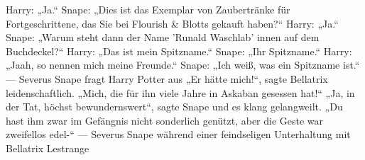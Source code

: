 \documentclass[a4paper, 10pt]{article}
\begin{document}
\newline
{}  
Harry: „Ja.“
\vspace{10pt}
\newline
{}  
Snape: „Dies ist das Exemplar von Zaubertränke für Fortgeschrittene, das Sie bei Flourish & Blotts gekauft haben?“
\vspace{10pt}
\newline
{}  
Harry: „Ja.“
\vspace{10pt}
\newline
{}  
Snape: „Warum steht dann der Name 'Runald Waschlab' innen auf dem Buchdeckel?“
\vspace{10pt}
\newline
{}  
Harry: „Das ist mein Spitzname.“
\vspace{10pt}
\newline
{}  
Snape: „Ihr Spitzname.“
\vspace{10pt}
\newline
{}  
Harry: „Jaah, so nennen mich meine Freunde.“
\vspace{10pt}
\newline
{}  
Snape: „Ich weiß, was ein Spitzname ist.“
\vspace{10pt}
\newline
{}  
— Severus Snape fragt Harry Potter aus
\vspace{10pt}
\newline
{}  
„Er hätte mich!“, sagte Bellatrix leidenschaftlich. „Mich, die für ihn viele Jahre in Askaban gesessen hat!“
\vspace{10pt}
\newline
{}  
„Ja, in der Tat, höchst bewundernswert“, sagte Snape und es klang gelangweilt. „Du hast ihm zwar im Gefängnis nicht sonderlich genützt, aber die Geste war zweifellos edel-“
— Severus Snape während einer feindseligen Unterhaltung mit Bellatrix Lestrange
\end{document}
